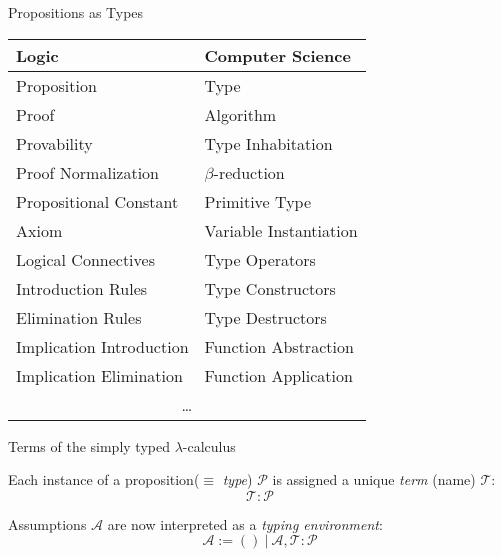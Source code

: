\documentclass{beamer}
\begin{document}
\begin{frame}{Propositions as Types}

	\footnotesize
	\centering
	\begin{tabularx}{0.825\textwidth}{@{}CC}
	\textbf{Logic} & \textbf{Computer Science}\\	
	\toprule
	Proposition & Type \\
	Proof & Algorithm \\
	Provability & Type Inhabitation \\ 
	Proof Normalization & $\beta$-reduction \\
	\midrule
	Propositional Constant & Primitive Type \\
	Axiom & Variable Instantiation \\
	Logical Connectives & Type Operators \\ 
	Introduction Rules & Type Constructors \\
	Elimination Rules & Type Destructors \\
	Implication Introduction & Function Abstraction \\
	Implication Elimination & Function Application \\
	 \\
	\end{tabularx} 	
\end{frame}

\begin{frame}{Terms of the simply typed $\lambda$-calculus}
	\small
	
	Each instance of a proposition($\equiv$ \textit{type}) $\mathcal{P}$ is assigned a unique \textit{term} (name) $\mathcal{T}$:
	\[
		\mathcal{T}: \mathcal{P}
	\]
	\vfill
	
	Assumptions $\mathcal{A}$ are now interpreted as a \textit{typing environment}:
	\[
		\mathcal{A} := ( ) \ | \ \mathcal{A}, \mathcal{T}: \mathcal{P}
	\]
	
\end{frame}
\end{document}
